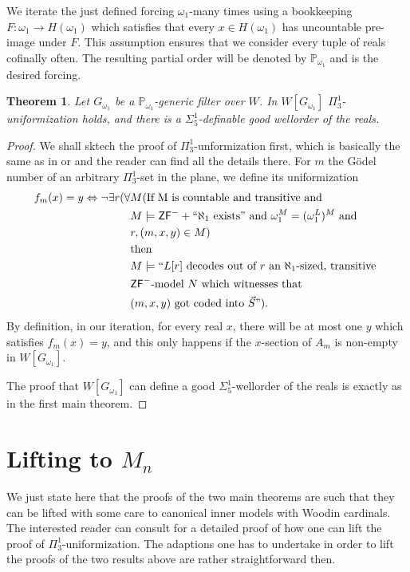 \documentclass[a4paper,11pt]{article}
\newtheorem{theorem}{Theorem}[section]
\newcommand{\forceP}{\mathbb{P}}
\newcommand{\ZFP}{\mathsf{ZF}^-}
\begin{document}
We iterate the just defined forcing $\omega_1$-many times using a bookkeeping $F: \omega_1 \rightarrow H(\omega_1)$ which satisfies that every $x\in H(\omega_1)$ has uncountable pre-image under $F$. This assumption ensures that we consider every tuple of reals cofinally often. The resulting partial order will be denoted by $\forceP_{\omega_1}$ and is the desired forcing.
\begin{theorem}
    Let $G_{\omega_1}$ be a $\forceP_{\omega_1}$-generic filter over $W$.
    In $W[G_{\omega_1}]$ $\Pi^1_3$-uniformization holds, and there is a $\Sigma^1_5$-definable good wellorder of the reals.
\end{theorem}
\begin{proof}
    We shall sktech the proof of $\Pi^1_3$-unformization first, which is basically the same as in \cite{Uniformization} or \cite{Uniformization with wellorder} and the reader can find all the details there.
    For $m$ the G\"odel number of an arbitrary $\Pi^1_3$-set in the plane, we define its uniformization
\begin{align*}
    f_m (x)=y \Leftrightarrow \lnot \exists r ( \forall &M (\text{If M is countable and transitive and} \\& M \models \ZFP+`` \text{$\aleph_1$ exists}"   \text{ and }  \omega_1^M=(\omega_1^L)^M  \text{ and } \\& r, (m,x,y) \in M  )
    \\& \text{then}
    \\& M \models ``L[r] \text{ decodes out of $r$ an $\aleph_1$-sized, transitive } \\&\text{$\ZFP$-model $N$ which }
    \text{witnesses that } \\& \text{$(m,x,y)$ got coded into $\vec{S}"$}).
\end{align*}
By definition, in our iteration, for every real $x$, there will be at most one $y$
    which satisfies $f_m(x)=y$, and this only happens if the $x$-section of $A_m$ is non-empty in $W[G_{\omega_1}]$. 

    The proof that $W[G_{\omega_1}]$ can define a good $\Sigma^1_5$-wellorder of the reals is exactly as in the first main theorem.
\end{proof}
   
\section{Lifting to \texorpdfstring{$M_n$}{Mn}}
We just state here that the proofs of the two main theorems are such that they can be lifted with some care to canonical inner models with Woodin cardinals. The interested reader can consult \cite{Uniformization} for a detailed proof of how one can lift the proof of $\Pi^1_3$-uniformization. The adaptions one has to undertake in order to lift the proofs of the two results above are rather straightforward then.
\end{document}
